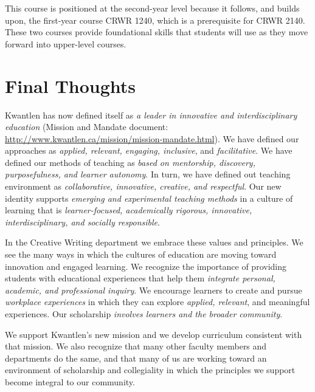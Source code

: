 \documentclass[letterpaper,10pt,headsepline]{scrreprt}
\begin{document}
This course is positioned at the second-year level because it follows, and builds upon, the first-year course CRWR 1240, which is a prerequisite for CRWR 2140. These two courses provide foundational skills that students will use as they move forward into upper-level courses.

\section{Final Thoughts}

Kwantlen has now defined itself as \textit{a leader in innovative and interdisciplinary education} (Mission and Mandate document: \url{http://www.kwantlen.ca/mission/mission-mandate.html}). We have defined our approaches as \textit{applied, relevant, engaging, inclusive}, and \textit{facilitative}. We have defined our methods of teaching as \textit{based on mentorship, discovery, purposefulness, and learner autonomy}. In turn, we have defined out teaching environment as \textit{collaborative, innovative, creative, and respectful}. Our new identity supports \textit{ emerging and experimental teaching methods} in a culture of learning that is \textit{learner-focused, academically rigorous, innovative, interdisciplinary, and socially responsible}.

In the Creative Writing department we embrace these values and principles. We see the many ways in which the cultures of education are moving toward innovation and engaged learning. We recognize the importance of providing students with educational experiences that help them \textit{integrate personal, academic, and professional inquiry}. We encourage learners to create and pursue \textit{workplace experiences} in which they can explore \textit{applied, relevant}, and meaningful experiences. Our scholarship \textit{involves learners and the broader community}. 

We support Kwantlen's new mission and we develop curriculum consistent with that mission. We also recognize that many other faculty members and departments do the same, and that many of us are working toward an environment of scholarship and collegiality in which the principles we support become integral to our community.
\end{document}
